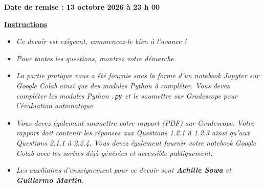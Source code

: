 \documentclass[12pt]{article}
\theoremstyle{definition}
\begin{document}
\fancyhead{}
\fancyfoot{}




\vspace{1cm}

\textbf{Date de remise : 13 octobre 2026 à 23 h 00}

\vspace{0.2cm}

\underline{\textbf{Instructions}}

\begin{itemize}
\item \emph{Ce devoir est exigeant, commencez-le bien à l'avance !}
\item \emph{Pour toutes les questions, montrez votre démarche.}
\item \emph{La partie pratique vous a été fournie sous la forme d'un notebook Jupyter sur Google Colab ainsi que des modules  Python à compléter. Vous devez compléter les modules Python \texttt{.py} et le soumettre sur Gradescope pour l'évaluation automatique.}
\item \emph{Vous devez également soumettre votre rapport (PDF) sur Gradescope. Votre rapport doit contenir les réponses aux Questions 1.2.1 à 1.2.3 ainsi qu'aux Questions 2.1.1 à 2.2.4. Vous devez également fournir votre notebook Google Colab avec les sorties déjà générées et accessible publiquement.}
\item \emph{Les auxiliaires d'enseignement pour ce devoir sont \textbf{Achille Sowa} et \textbf{Guillermo Martin}.}
\end{itemize}
\vspace{0.2cm}

\vspace{0.4cm}
\end{document}

